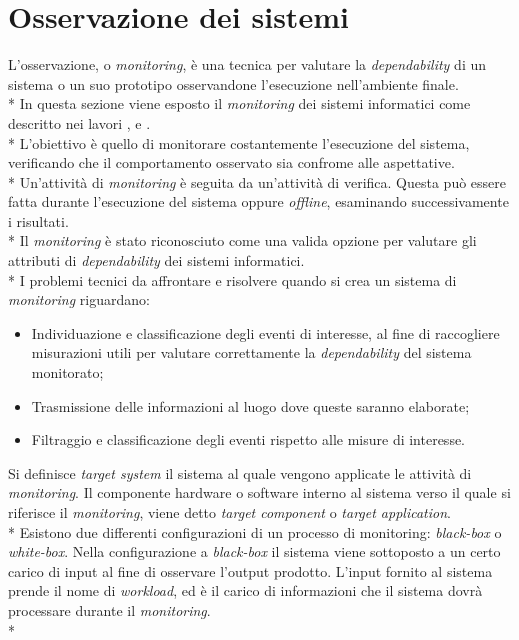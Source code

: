 \section{Osservazione dei sistemi}
L'osservazione, o \emph{monitoring}, \`e una tecnica per valutare la \emph{dependability} di un sistema o un suo prototipo osservandone l'esecuzione nell'ambiente finale.\\*
In questa sezione viene esposto il \emph{monitoring} dei sistemi informatici come descritto nei lavori \cite{monitor1}, \cite{monitor2} e \cite{monitor3}.\\*
L'obiettivo \`e quello di monitorare costantemente l'esecuzione del sistema, verificando che il comportamento osservato sia confrome alle aspettative.\\*
Un'attivit\`a di \emph{monitoring} \`e seguita da un'attivit\`a di verifica. Questa pu\`o essere fatta durante l'esecuzione del sistema oppure \emph{offline}, esaminando successivamente i risultati.\\*
Il \emph{monitoring} \`e stato riconosciuto come una valida opzione per valutare gli attributi di \emph{dependability} dei sistemi informatici.\\*
I problemi tecnici da affrontare e risolvere quando si crea un sistema di \emph{monitoring} riguardano:
\begin{itemize}
	\item Individuazione e classificazione degli eventi di interesse, al fine di raccogliere misurazioni utili per valutare correttamente la \emph{dependability} del sistema monitorato;
	\item Trasmissione delle informazioni al luogo dove queste saranno elaborate;
	\item Filtraggio e classificazione degli eventi rispetto alle misure di interesse.
\end{itemize}
Si definisce \emph{target system} il sistema al quale vengono applicate le attivit\`a di \emph{monitoring}. Il componente hardware o software interno al sistema verso il quale si riferisce il \emph{monitoring}, viene detto \emph{target component} o \emph{target application}.\\*
Esistono due differenti configurazioni di un processo di monitoring: \emph{black-box} o \emph{white-box}. Nella configurazione a \emph{black-box} il sistema viene sottoposto a un certo carico di input al fine di osservare l'output prodotto. L'input fornito al sistema prende il nome di \emph{workload}, ed \`e il carico di informazioni che il sistema dovr\`a processare durante il \emph{monitoring}.\\*

